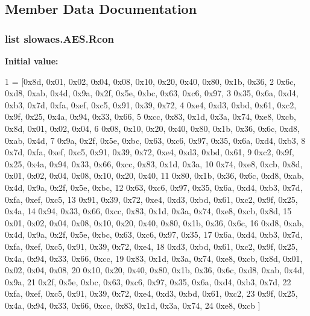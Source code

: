 \subsection{Member Data Documentation}
\hypertarget{classslowaes_1_1_a_e_s_aa0babc9f3a99719fe10eb8b269ecd794}{
\subsubsection[{Rcon}]{\setlength{\rightskip}{0pt plus 5cm}list slowaes.\-A\-E\-S.\-Rcon\hspace{0.3cm}{\ttfamily [static]}}}\label{classslowaes_1_1_a_e_s_aa0babc9f3a99719fe10eb8b269ecd794}
{\bfseries Initial value\-:}
\begin{DoxyCode}
1 = [0x8d, 0x01, 0x02, 0x04, 0x08, 0x10, 0x20, 0x40, 0x80, 0x1b, 0x36,
2             0x6c, 0xd8, 0xab, 0x4d, 0x9a, 0x2f, 0x5e, 0xbc, 0x63, 0xc6, 0x97,
3             0x35, 0x6a, 0xd4, 0xb3, 0x7d, 0xfa, 0xef, 0xc5, 0x91, 0x39, 0x72,
4             0xe4, 0xd3, 0xbd, 0x61, 0xc2, 0x9f, 0x25, 0x4a, 0x94, 0x33, 0x66,
5             0xcc, 0x83, 0x1d, 0x3a, 0x74, 0xe8, 0xcb, 0x8d, 0x01, 0x02, 0x04,
6             0x08, 0x10, 0x20, 0x40, 0x80, 0x1b, 0x36, 0x6c, 0xd8, 0xab, 0x4d,
7             0x9a, 0x2f, 0x5e, 0xbc, 0x63, 0xc6, 0x97, 0x35, 0x6a, 0xd4, 0xb3,
8             0x7d, 0xfa, 0xef, 0xc5, 0x91, 0x39, 0x72, 0xe4, 0xd3, 0xbd, 0x61,
9             0xc2, 0x9f, 0x25, 0x4a, 0x94, 0x33, 0x66, 0xcc, 0x83, 0x1d, 0x3a,
10             0x74, 0xe8, 0xcb, 0x8d, 0x01, 0x02, 0x04, 0x08, 0x10, 0x20, 0x40,
11             0x80, 0x1b, 0x36, 0x6c, 0xd8, 0xab, 0x4d, 0x9a, 0x2f, 0x5e, 0xbc,
12             0x63, 0xc6, 0x97, 0x35, 0x6a, 0xd4, 0xb3, 0x7d, 0xfa, 0xef, 0xc5,
13             0x91, 0x39, 0x72, 0xe4, 0xd3, 0xbd, 0x61, 0xc2, 0x9f, 0x25, 0x4a,
14             0x94, 0x33, 0x66, 0xcc, 0x83, 0x1d, 0x3a, 0x74, 0xe8, 0xcb, 0x8d,
15             0x01, 0x02, 0x04, 0x08, 0x10, 0x20, 0x40, 0x80, 0x1b, 0x36, 0x6c,
16             0xd8, 0xab, 0x4d, 0x9a, 0x2f, 0x5e, 0xbc, 0x63, 0xc6, 0x97, 0x35,
17             0x6a, 0xd4, 0xb3, 0x7d, 0xfa, 0xef, 0xc5, 0x91, 0x39, 0x72, 0xe4,
18             0xd3, 0xbd, 0x61, 0xc2, 0x9f, 0x25, 0x4a, 0x94, 0x33, 0x66, 0xcc,
19             0x83, 0x1d, 0x3a, 0x74, 0xe8, 0xcb, 0x8d, 0x01, 0x02, 0x04, 0x08,
20             0x10, 0x20, 0x40, 0x80, 0x1b, 0x36, 0x6c, 0xd8, 0xab, 0x4d, 0x9a,
21             0x2f, 0x5e, 0xbc, 0x63, 0xc6, 0x97, 0x35, 0x6a, 0xd4, 0xb3, 0x7d,
22             0xfa, 0xef, 0xc5, 0x91, 0x39, 0x72, 0xe4, 0xd3, 0xbd, 0x61, 0xc2,
23             0x9f, 0x25, 0x4a, 0x94, 0x33, 0x66, 0xcc, 0x83, 0x1d, 0x3a, 0x74,
24             0xe8, 0xcb ]
\end{DoxyCode}
